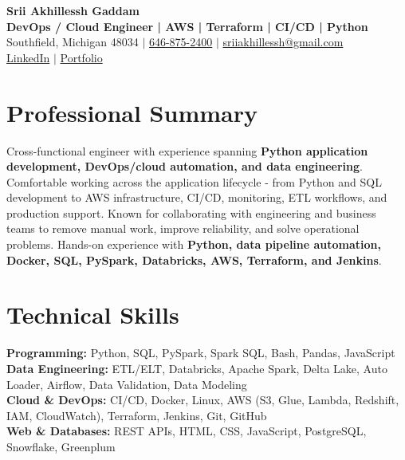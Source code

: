 \documentclass[letterpaper,10pt]{article}
\begin{document}
\fontsize{9.35pt}{10.45pt}\selectfont

\begin{center}
    {\LARGE \textbf{Srii Akhillessh Gaddam}} \\[-1pt]
    \textbf{DevOps / Cloud Engineer | AWS | Terraform | CI/CD | Python} \\[2pt]
    Southfield, Michigan 48034 $|$
    \href{tel:6468752400}{646-875-2400} $|$
    \href{mailto:sriiakhillessh@gmail.com}{sriiakhillessh@gmail.com} \\[1pt]
    \href{https://www.linkedin.com/in/srii-akhiilessh-gaddam-b48668191/}{LinkedIn} $|$
    \href{https://sriiakhillesshg.github.io/portfolio/}{Portfolio}
\end{center}
\vspace{-8pt}

\section{Professional Summary}
\small{Cross-functional engineer with experience spanning \textbf{Python application development, DevOps/cloud automation, and data engineering}. Comfortable working across the application lifecycle - from Python and SQL development to AWS infrastructure, CI/CD, monitoring, ETL workflows, and production support. Known for collaborating with engineering and business teams to remove manual work, improve reliability, and solve operational problems. Hands-on experience with \textbf{Python, data pipeline automation, Docker, SQL, PySpark, Databricks, AWS, Terraform, and Jenkins}.}

\section{Technical Skills}
\small{
\textbf{Programming:} Python, SQL, PySpark, Spark SQL, Bash, Pandas, JavaScript \\
\textbf{Data Engineering:} ETL/ELT, Databricks, Apache Spark, Delta Lake, Auto Loader, Airflow, Data Validation, Data Modeling \\
\textbf{Cloud \& DevOps:} CI/CD, Docker, Linux, AWS (S3, Glue, Lambda, Redshift, IAM, CloudWatch), Terraform, Jenkins, Git, GitHub \\
\textbf{Web \& Databases:} REST APIs, HTML, CSS, JavaScript, PostgreSQL, Snowflake, Greenplum
}
\end{document}
